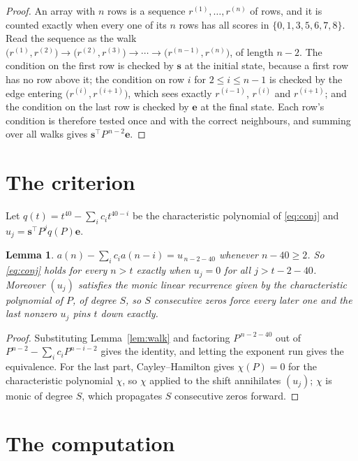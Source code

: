 \documentclass[11pt,a4paper]{article}
\theoremstyle{plain}
\newtheorem{lemma}[theorem]{Lemma}
\theoremstyle{definition}
\begin{document}
\begin{proof}
An array with $n$ rows is a sequence $r^{(1)},\dots,r^{(n)}$ of rows, and it is counted
exactly when every one of its $n$ rows has all scores in $\{0,1,3,5,6,7,8\}$. Read the sequence as the
walk $\bigl(r^{(1)},r^{(2)}\bigr)\to\bigl(r^{(2)},r^{(3)}\bigr)\to\cdots\to
\bigl(r^{(n-1)},r^{(n)}\bigr)$, of length $n-2$. The condition on the first row is
checked by $\mathbf{s}$ at the initial state, because a first row has no row above it; the
condition on row $i$ for $2\le i\le n-1$ is checked by the edge entering
$\bigl(r^{(i)},r^{(i+1)}\bigr)$, which sees exactly $r^{(i-1)}$, $r^{(i)}$ and
$r^{(i+1)}$; and the condition on the last row is checked by $\mathbf{e}$ at the final
state. Each row's condition is therefore tested once and with the correct neighbours, and
summing over all walks gives $\mathbf{s}^{\!\top}P^{\,n-2}\mathbf{e}$.
\end{proof}

\section{The criterion}

Let $q(t)=t^{40}-\sum_i c_i t^{40-i}$ be the characteristic polynomial of
\eqref{eq:conj} and $u_j=\mathbf{s}^{\!\top}P^{j}q(P)\mathbf{e}$.

\begin{lemma}\label{lem:crit}
$a(n)-\sum_i c_i a(n-i)=u_{\,n-2-40}$ whenever $n-40\ge2$. So \eqref{eq:conj}
holds for every $n>t$ exactly when $u_j=0$ for all $j>t-2-40$. Moreover $(u_j)$
satisfies the monic linear recurrence given by the characteristic polynomial of $P$, of
degree $S$, so $S$ consecutive zeros force every later one and the last nonzero $u_j$ pins
$t$ down exactly.
\end{lemma}

\begin{proof}
Substituting Lemma~\ref{lem:walk} and factoring $P^{\,n-2-40}$ out of
$P^{n-2}-\sum_i c_i P^{n-i-2}$ gives the identity, and letting the exponent run gives the
equivalence. For the last part, Cayley--Hamilton gives $\chi(P)=0$ for the characteristic
polynomial $\chi$, so $\chi$ applied to the shift annihilates $(u_j)$; $\chi$ is monic of
degree $S$, which propagates $S$ consecutive zeros forward.
\end{proof}

\section{The computation}
\end{document}
